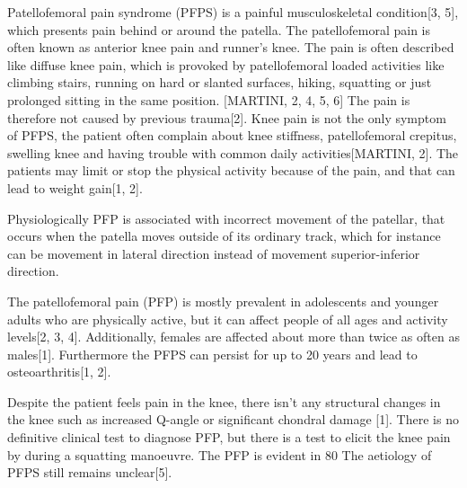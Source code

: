 Patellofemoral pain syndrome (PFPS) is a painful musculoskeletal condition[3, 5], which presents pain behind or around the patella. The patellofemoral pain is often known as anterior knee pain and runner’s knee. The pain is often described like diffuse knee pain, which is provoked by patellofemoral loaded activities like climbing stairs, running on hard or slanted surfaces, hiking, squatting or just prolonged sitting in the same position. [MARTINI, 2, 4, 5, 6] The pain is therefore not caused by previous trauma[2].
Knee pain is not the only symptom of PFPS, the patient often complain about knee stiffness, patellofemoral crepitus, swelling knee and having trouble with common daily activities[MARTINI, 2]. The patients may limit or stop the physical activity because of the pain, and that can lead to weight gain[1, 2].

Physiologically PFP is associated with incorrect movement of the patellar, that occurs when the patella moves outside of its ordinary track, which for instance can be movement in lateral direction instead of movement superior-inferior direction.\citep{Martini2012}

The patellofemoral pain (PFP) is mostly prevalent in adolescents and younger adults who are physically active, but it can affect people of all ages and activity levels[2, 3, 4]. Additionally,  females are affected about more than twice as often as males[1]. Furthermore the PFPS can persist for up to 20 years and lead to osteoarthritis[1, 2].

Despite the patient feels pain in the knee, there isn’t any structural changes in the knee such as increased Q-angle or significant chondral damage [1]. There is no definitive clinical test to diagnose PFP, but there is a test to elicit the knee pain by during a squatting manoeuvre. The PFP is evident in 80 %
The aetiology of PFPS still remains unclear[5].
